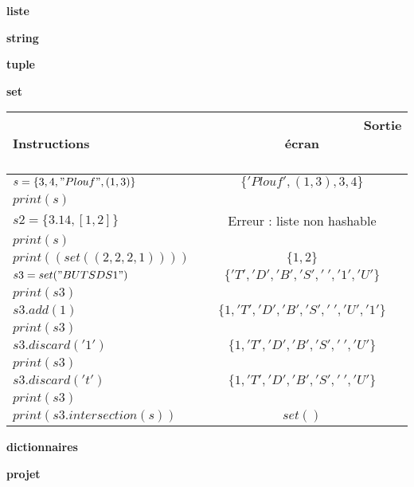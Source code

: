 
\textbf{liste}



\textbf{string}



\textbf{tuple}



\textbf{set}

\begin{tabular}{|l|c|}
    \hline   Instructions &  ~~~~~~~~~~~~~~~~~~~~~~Sortie écran ~~~~~~~~~~~~~~~~~~~~~~\\\hline
     $s = \{3, 4, "Plouf", (1, 3)\}$ & $\{'Plouf',(1, 3), 3, 4\}$ \\
     $print(s)$ &  \\\hline
      $s2 = \{3.14, [1, 2]\}$ & Erreur : liste non hashable\\
     $print(s)$ &  \\\hline
       $print((set((2, 2, 2, 1))))$& $\{1, 2\}$\\\hline
      $s3 = set("BUT SD S1")$ & $\{'T', 'D', 'B', 'S', '~', '1', 'U'\}$ \\ 
       $print(s3)$&\\\hline
      $s3.add(1)$ & $\{1, 'T', 'D', 'B', 'S', '~', 'U', '1'\}$ \\ 
       $print(s3)$&\\\hline
      $s3.discard('1')$ & $\{1, 'T', 'D', 'B', 'S', '~',  'U'\}$ \\ 
       $print(s3)$&\\\hline
      $s3.discard('t')$ & $\{1, 'T', 'D', 'B', 'S', '~',  'U'\}$ \\ 
       $print(s3)$&\\\hline
      $print(s3.intersection(s))$& $set()$  \\\hline
\end{tabular}


\textbf{dictionnaires}


\textbf{projet}
